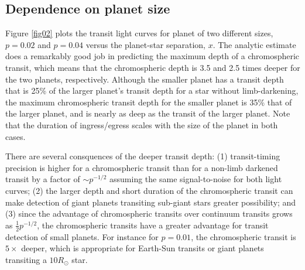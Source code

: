 \documentclass[manuscript]{aastex}
\begin{document}
\subsection{Dependence on planet size}

Figure \ref{fig02} plots the transit light curves for planet of
two different sizes, $p=0.02$ and $p=0.04$ versus the planet-star
separation, $x$.  The analytic estimate does a remarkably good
job in predicting the maximum depth of a chromospheric transit,
which means that the chromospheric depth is 3.5 and 2.5 times
deeper for the two planets, respectively.  Although the smaller
planet has a transit depth that is 25\% of the larger planet's
transit depth for a star without limb-darkening, the maximum 
chromospheric transit depth for the smaller planet is 35\% that 
of the larger planet, and is nearly as deep as the transit of 
the larger planet.  Note that the duration of ingress/egress 
scales with the size of the planet in both cases.  

There are several consquences of the deeper transit depth:
(1) transit-timing precision is higher for a chromospheric
transit than for a non-limb darkened transit by a factor of
$\sim p^{-1/2}$ assuming the same signal-to-noise for
both light curves; (2) the larger depth and short duration
of the chromospheric transit can make detection of giant
planets transiting sub-giant stars greater possibility;
and (3) since the advantage of chromospheric transits
over continuum transits grows as $\frac{1}{2}p^{-1/2}$,
the chromospheric transits have a greater advantage for
transit detection of small planets. For instance
for $p=0.01$, the chromospheric transit is $5\times$
deeper, which is appropriate for Earth-Sun transits
or giant planets transiting a $10R_\odot$ star.

\end{document}
